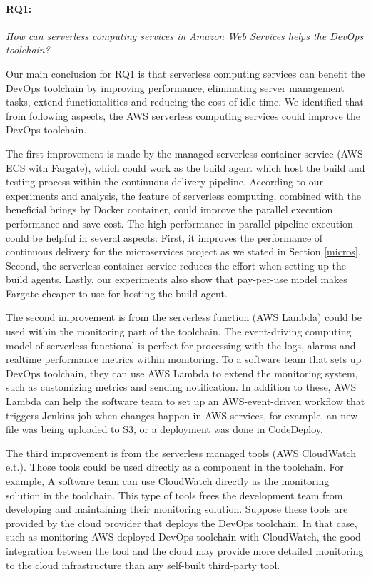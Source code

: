 \paragraph{RQ1:} \textit{How can serverless computing services in Amazon Web Services helps the DevOps toolchain?}
\medskip
\par
Our main conclusion for RQ1 is that serverless computing services can benefit the DevOps toolchain by improving performance, eliminating server management tasks, extend functionalities and reducing the cost of idle time.
We identified that from following aspects, the AWS serverless computing services could improve the DevOps toolchain.
\par
The first improvement is made by the managed serverless container service (AWS ECS with Fargate), which could work as the build agent which host the build and testing process within the continuous delivery pipeline. According to our experiments and analysis, the feature of serverless computing, combined with the beneficial brings by Docker container, could improve the parallel execution performance and save cost. The high performance in parallel pipeline execution could be helpful in several aspects: First, it improves the performance of continuous delivery for the microservices project as we stated in Section \ref{micros}. Second, the serverless container service reduces the effort when setting up the build agents. Lastly, our experiments also show that pay-per-use model makes Fargate cheaper to use for hosting the build agent.
\par
The second improvement is from the serverless function (AWS Lambda) could be used within the monitoring part of the toolchain. The event-driving computing model of serverless functional is perfect for processing with the logs, alarms and realtime performance metrics within monitoring. To a software team that sets up DevOps toolchain, they can use AWS Lambda to extend the monitoring system, such as customizing metrics and sending notification. In addition to these, AWS Lambda can help the software team to set up an AWS-event-driven workflow that triggers Jenkins job when changes happen in AWS services, for example, an new file was being uploaded to S3, or a deployment was done in CodeDeploy.
\par
The third improvement is from the serverless managed tools (AWS CloudWatch e.t.). Those tools could be used directly as a component in the toolchain. For example, A software team can use CloudWatch directly as the monitoring solution in the toolchain. This type of tools frees the development team from developing and maintaining their monitoring solution. Suppose these tools are provided by the cloud provider that deploys the DevOps toolchain. In that case, such as monitoring AWS deployed DevOps toolchain with CloudWatch, the good integration between the tool and the cloud may provide more detailed monitoring to the cloud infrastructure than any self-built third-party tool.
